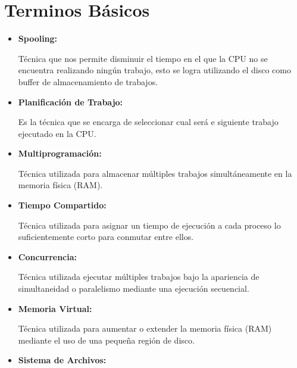 \documentclass[12pt, fleqn]{report}                             %
\begin{document}
        \section{Terminos Básicos}

            \begin{itemize}
                \item
                    \textbf{Spooling: }

                    Técnica que nos permite disminuir el tiempo en el que la CPU no se encuentra
                    realizando ningún trabajo, esto se logra utilizando el disco como buffer de
                    almacenamiento de trabajos.

                \item
                    \textbf{Planificación de Trabajo: }

                    Es la técnica que se encarga de seleccionar cual será e siguiente trabajo
                    ejecutado en la CPU.

                \item
                    \textbf{Multiprogramación: }

                    Técnica utilizada para almacenar múltiples trabajos simultáneamente en la 
                    memoria física (RAM).

                \item
                    \textbf{Tiempo Compartido: }

                    Técnica utilizada para asignar un tiempo de ejecución a cada proceso
                    lo suficientemente corto para conmutar entre ellos.

                \item
                    \textbf{Concurrencia: }

                    Técnica utilizada ejecutar múltiples trabajos bajo la apariencia de
                    simultaneidad o paralelismo mediante una ejecución secuencial.

                \item
                    \textbf{Memoria Virtual: }

                    Técnica utilizada para aumentar o extender la memoria física (RAM) mediante
                    el uso de una pequeña región de disco.

                \item
                    \textbf{Sistema de Archivos: }


\end{itemize}
\end{document}
